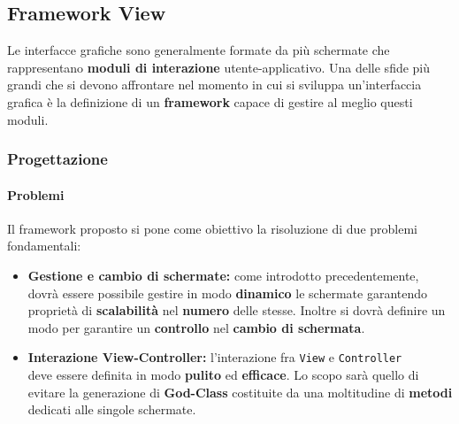 \subsection{Framework View}
\label{subsec:arc_view}
Le interfacce grafiche sono generalmente formate da più schermate che rappresentano \textbf{moduli di interazione} utente-applicativo. Una delle sfide più grandi che si devono affrontare nel momento in cui si sviluppa un'interfaccia grafica è la definizione di un \textbf{framework} capace di gestire al meglio questi moduli. 

\subsubsection{Progettazione}
\paragraph{Problemi}
Il framework proposto si pone come obiettivo la risoluzione di due problemi fondamentali:
\begin{itemize}
 	\item{\textbf{Gestione e cambio di schermate:}} come introdotto precedentemente, dovrà essere possibile gestire in modo \textbf{dinamico} le schermate garantendo proprietà di \textbf{scalabilità} nel \textbf{numero} delle stesse. Inoltre si dovrà definire un modo per garantire un \textbf{controllo} nel \textbf{cambio di schermata}.
 	\item{\textbf{Interazione View-Controller:}} l'interazione fra \texttt{View} e \texttt{Controller} \\deve essere definita in modo \textbf{pulito} ed \textbf{efficace}. Lo scopo sarà quello di evitare la generazione di \textbf{God-Class} costituite da una moltitudine di \textbf{metodi} dedicati alle singole schermate.
 \end{itemize}
